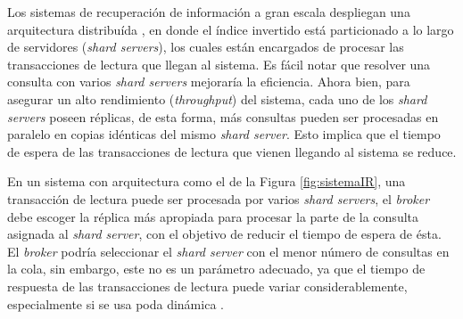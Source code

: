 Los sistemas de recuperación de información a gran escala despliegan una arquitectura distribuída \citep{Dean:2009}, en donde el índice invertido está particionado \citep{Barroso:2003} a lo largo de servidores (\textit{shard servers}), los cuales están encargados de procesar las transacciones de lectura que llegan al sistema. Es fácil notar que resolver una consulta con varios \textit{shard servers} mejoraría la eficiencia. Ahora bien, para asegurar un alto rendimiento (\textit{throughput}) del sistema, cada uno de los \textit{shard servers} poseen réplicas, de esta forma, más consultas pueden ser procesadas en paralelo en copias idénticas del mismo \textit{shard server}. Esto implica que el tiempo de espera de las transacciones de lectura que vienen llegando al sistema se reduce. 

En un sistema con arquitectura como el de la Figura \ref{fig:sistemaIR}, una transacción de lectura puede ser procesada por varios \textit{shard servers}, el \textit{broker} debe escoger la réplica más apropiada para procesar la parte de la consulta asignada al \textit{shard server}, con el objetivo de reducir el tiempo de espera de ésta. El \textit{broker} podría seleccionar el \textit{shard server} con el menor número de consultas en la cola, sin embargo, este no es un parámetro adecuado, ya que el tiempo de respuesta de las transacciones de lectura puede variar considerablemente, especialmente si se usa poda dinámica \citep{Broder:2003, Moffat:1996}. 

